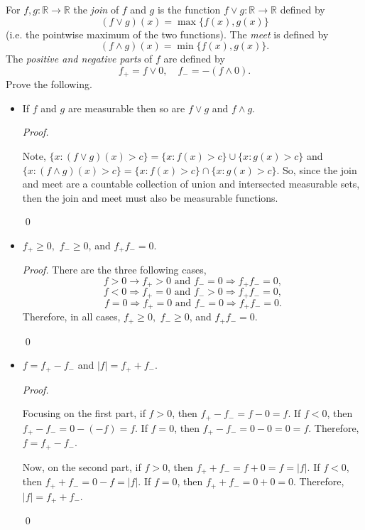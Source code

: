 \documentclass[12pt]{article}
\newenvironment{problem}[2][Problem]{\begin{trivlist}
\item[\hskip \labelsep {\bfseries #1}\hskip \labelsep {\bfseries
#2.}]}{\end{trivlist}}
\newenvironment{sol}
    {\emph{Proof.}
    }
    {
    \qed
    }
\begin{document}
\begin{problem}{48}
  For $f,g : \mathbb{R} \to \mathbb{R}$ the \textit{join} of $f$ and $g$ is the function $f \vee g : \mathbb{R} \to \mathbb{R}$ defined by $$(f \vee g)(x) = \max\{f(x),g(x)\}$$ (i.e. the pointwise maximum of the two functions). The \textit{meet} is defined by $$(f \wedge g)(x) = \min\{f(x),g(x)\}.$$ The \textit{positive and negative parts} of $f$ are defined by $$f_+ = f \vee 0, \hspace{1em} f_- = -(f \wedge 0).$$ Prove the following.
  \begin{itemize}
    \item[(i)] If $f$ and $g$ are measurable then so are $f \vee g$ and $f \wedge g$.
    
    \begin{sol}
      Note, $\{x : (f \vee g)(x) > c\} = \{x : f(x) > c\} \cup \{x : g(x) > c\}$ and $\{x : (f \wedge g)(x) > c\} = \{x : f(x) > c\} \cap \{x : g(x) > c\}$. So, since the join and meet are a countable collection of union and intersected measurable sets, then the join and meet must also be measurable functions.
    \end{sol}

    \item[(ii)] $f_+ \geq 0,$ $f_- \geq 0$, and $f_+f_- = 0$.
    
    \begin{sol} There are the three following cases,
      $$f > 0 \longrightarrow f_+ > 0 \text{ and } f_- = 0 \Longrightarrow f_+f_- = 0,$$
      $$f < 0 \Longrightarrow f_+ = 0 \text{ and } f_- > 0 \Longrightarrow f_+f_- = 0,$$
      $$f = 0 \Longrightarrow f_+ = 0 \text{ and } f_- = 0 \Longrightarrow f_+f_- = 0.$$
      Therefore, in all cases, $f_+ \geq 0,$ $f_- \geq 0$, and $f_+f_- = 0$.
    \end{sol}

    \item[(iii)] $f = f_+-f_-$ and $|f| = f_++f_-$.
    
    \begin{sol}
      Focusing on the first part, if $f > 0$, then $f_+ - f_- = f - 0 = f$. If $f < 0$, then $f_+ - f_- = 0 - (-f) = f$. If $f = 0$, then $f_+ - f_- = 0 - 0 = 0 = f$. Therefore, $f = f_+ - f_-$. 

      Now, on the second part, if $f > 0$, then $f_+ + f_- = f + 0 = f = |f|$. If $f < 0$, then $f_+ + f_- = 0 - f = |f|$. If $f = 0$, then $f_+ + f_- = 0 + 0 = 0$. Therefore, $|f| = f_+ + f_-$.
    \end{sol}
    

\end{itemize}
\end{problem}
\end{document}
